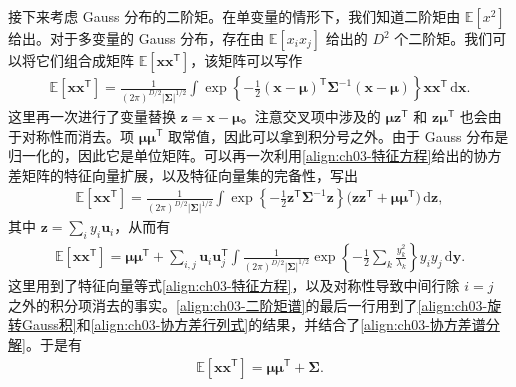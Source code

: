 \documentclass[../../main.tex]{subfiles}
\begin{document}
接下来考虑 Gauss 分布的二阶矩。在单变量的情形下，我们知道二阶矩由 $\mathbb{E}[x^{2}]$ 给出。对于多变量的 Gauss 分布，存在由 $\mathbb{E}[x_i x_j]$ 给出的 $D^{2}$ 个二阶矩。我们可以将它们组合成矩阵 $\mathbb{E}[\boldsymbol{x}\boldsymbol{x}^{\mathsf{T}}]$，该矩阵可以写作
\begin{align}
\mathbb{E}[\boldsymbol{x}\boldsymbol{x}^{\mathsf{T}}]=\frac{1}{(2\pi)^{D/2}\lvert\boldsymbol{\Sigma}\rvert^{1/2}}\int\exp\left\{-\frac{1}{2}(\boldsymbol{x}-\boldsymbol{\mu})^{\mathsf{T}}\boldsymbol{\Sigma}^{-1}(\boldsymbol{x}-\boldsymbol{\mu})\right\}\boldsymbol{x}\boldsymbol{x}^{\mathsf{T}}\,\mathrm{d}\boldsymbol{x}.
\label{align:ch03-二阶矩积分}
\end{align}
这里再一次进行了变量替换 $\boldsymbol{z}=\boldsymbol{x}-\boldsymbol{\mu}$。注意交叉项中涉及的 $\boldsymbol{\mu}\boldsymbol{z}^{\mathsf{T}}$ 和 $\boldsymbol{z}\boldsymbol{\mu}^{\mathsf{T}}$ 也会由于对称性而消去。项 $\boldsymbol{\mu}\boldsymbol{\mu}^{\mathsf{T}}$ 取常值，因此可以拿到积分号之外。由于 Gauss 分布是归一化的，因此它是单位矩阵。可以再一次利用\eqref{align:ch03-特征方程}给出的协方差矩阵的特征向量扩展，以及特征向量集的完备性，写出
\begin{align}
\mathbb{E}[\boldsymbol{x}\boldsymbol{x}^{\mathsf{T}}]=\frac{1}{(2\pi)^{D/2}\lvert\boldsymbol{\Sigma}\rvert^{1/2}}\int\exp\left\{-\frac{1}{2}\boldsymbol{z}^{\mathsf{T}}\boldsymbol{\Sigma}^{-1}\boldsymbol{z}\right\}\bigl(\boldsymbol{z}\boldsymbol{z}^{\mathsf{T}}+\boldsymbol{\mu}\boldsymbol{\mu}^{\mathsf{T}}\bigr)\,\mathrm{d}\boldsymbol{z},
\label{align:ch03-二阶矩展开}
\end{align}
其中 $\boldsymbol{z}=\sum_{i}y_{i}\boldsymbol{u}_{i}$，从而有
\begin{align}
\mathbb{E}[\boldsymbol{x}\boldsymbol{x}^{\mathsf{T}}]=\boldsymbol{\mu}\boldsymbol{\mu}^{\mathsf{T}}+\sum_{i,j}\boldsymbol{u}_{i}\boldsymbol{u}_{j}^{\mathsf{T}}\int\frac{1}{(2\pi)^{D/2}\lvert\boldsymbol{\Sigma}\rvert^{1/2}}\exp\left\{-\frac{1}{2}\sum_{k}\frac{y_{k}^{2}}{\lambda_{k}}\right\}y_{i}y_{j}\,\mathrm{d}\boldsymbol{y}.
\label{align:ch03-二阶矩谱}
\end{align}
这里用到了特征向量等式\eqref{align:ch03-特征方程}，以及对称性导致中间行除 $i=j$ 之外的积分项消去的事实。\eqref{align:ch03-二阶矩谱}的最后一行用到了\cref{align:ch03-旋转Gauss积}和\cref{align:ch03-协方差行列式}的结果，并结合了\eqref{align:ch03-协方差谱分解}。于是有
\begin{align}
\mathbb{E}[\boldsymbol{x}\boldsymbol{x}^{\mathsf{T}}]=\boldsymbol{\mu}\boldsymbol{\mu}^{\mathsf{T}}+\boldsymbol{\Sigma}.
\label{align:ch03-二阶矩}
\end{align}
\end{document}
